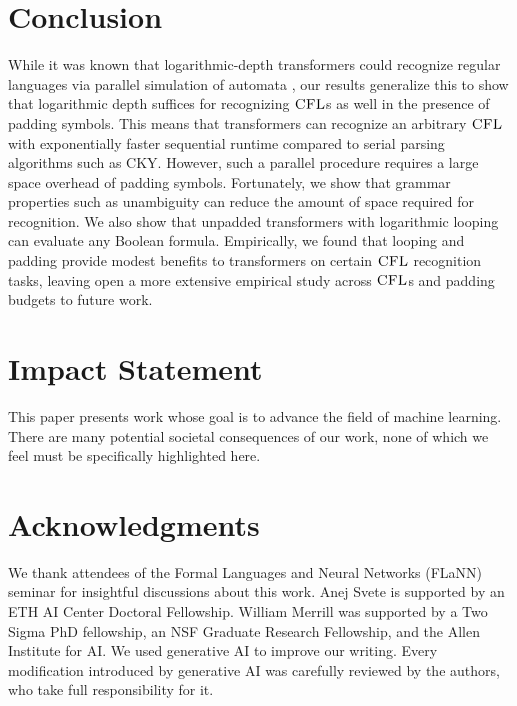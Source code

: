 \documentclass{article}
\begin{document}
\section{Conclusion}
While it was known that logarithmic-depth transformers could recognize regular languages via parallel simulation of automata \citep{liu2023transformerslearnshortcutsautomata, li2025how}, our results generalize this to show that logarithmic depth suffices for recognizing ${\textsc{CFL}}$s as well in the presence of padding symbols.
This means that transformers can recognize an arbitrary ${\textsc{CFL}}$ with exponentially faster sequential runtime compared to serial parsing algorithms such as CKY.
However, such a parallel procedure requires a large space overhead of padding symbols.
Fortunately, we show that grammar properties such as unambiguity can reduce the amount of space required for recognition. 
We also show that unpadded transformers with logarithmic looping can evaluate any Boolean formula. 
Empirically, we found that looping and padding provide modest benefits to transformers on certain ${\textsc{CFL}}$ recognition tasks, leaving open a more extensive empirical study across ${\textsc{CFL}}$s and padding budgets to future work.

\section*{Impact Statement}
This paper presents work whose goal is to advance the field of machine learning. There are many potential societal consequences of our work, none of which we feel must be specifically highlighted here.


\section*{Acknowledgments}
We thank attendees of the Formal Languages and Neural Networks (FLaNN) seminar for insightful discussions about this work.
Anej Svete is supported by an ETH AI Center Doctoral Fellowship.
William Merrill was supported by a Two Sigma PhD fellowship, an NSF Graduate Research Fellowship, and the Allen Institute for AI.
We used generative AI to
improve our writing.
Every modification introduced by generative AI
was carefully reviewed by the authors, who take
full responsibility for it.




\newpage
\appendix
\onecolumn
\end{document}
